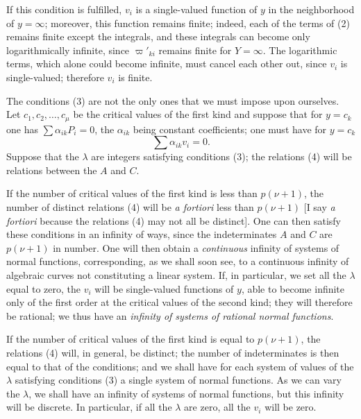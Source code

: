 \documentclass{article}
\begin{document}
If this condition is fulfilled, $v_{i}$ is a single-valued function of $y$ in the neighborhood of $y = \infty$; moreover, this function remains finite; indeed, each of the terms of (2) remains finite except the integrals, and these integrals can become only logarithmically infinite, since $\varpi'_{ki}$ remains finite for $Y = \infty$. The logarithmic terms, which alone could become infinite, must cancel each other out, since $v_{i}$ is single-valued; therefore $v_{i}$ is finite.

The conditions (3) are not the only ones that we must impose upon ourselves. Let $c_{1}, c_{2}, \ldots, c_{\mu}$ be the critical values of the first kind and suppose that for $y = c_{k}$ one has $\displaystyle\sum \alpha_{ik} P_{i} = 0$, the $\alpha_{ik}$ being constant coefficients; one must have for $y = c_{k}$
\[
\sum \alpha_{ik} v_{i} = 0. \tag{4}
\]
Suppose that the $\lambda$ are integers satisfying conditions (3); the relations (4) will be relations between the $A$ and $C$.

If the number of critical values of the first kind is less than $p(\nu + 1)$, the number of distinct relations (4) will be \emph{a fortiori} less than $p(\nu + 1)$ [I say \emph{a fortiori} because the relations (4) may not all be distinct]. One can then satisfy these conditions in an infinity of ways, since the indeterminates $A$ and $C$ are $p(\nu + 1)$ in number. One will then obtain a \emph{continuous} infinity of systems of normal functions, corresponding, as we shall soon see, to a continuous infinity of algebraic curves not constituting a linear system.
If, in particular, we set all the $\lambda$ equal to zero, the $v_{i}$ will be single-valued functions of $y$, able to become infinite only of the first order at the critical values of the second kind; they will therefore be rational; we thus have an \emph{infinity of systems of rational normal functions}.

If the number of critical values of the first kind is equal to $p(\nu + 1)$, the relations (4) will, in general, be distinct; the number of indeterminates is then equal to that of the conditions; and we shall have for each system of values of the $\lambda$ satisfying conditions (3) a single system of normal functions. As we can vary the $\lambda$, we shall have an infinity of systems of normal functions, but this infinity will be discrete. In particular, if all the $\lambda$ are zero, all the $v_{i}$ will be zero.
\end{document}
